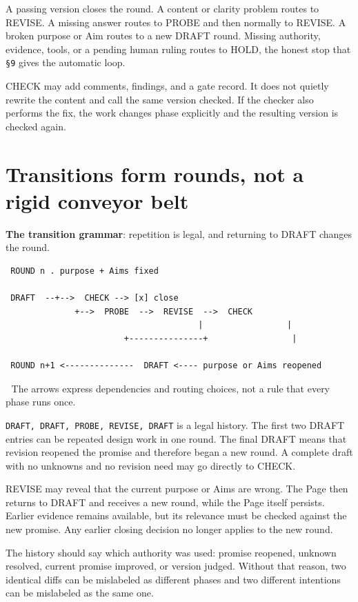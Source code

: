 A passing version closes the round. A content or clarity problem routes to REVISE. A missing answer routes to PROBE and then normally to REVISE. A broken purpose or Aim routes to a new DRAFT round. Missing authority, evidence, tools, or a pending human ruling routes to HOLD, the honest stop that \texttt{§9} gives the automatic loop.

CHECK may add comments, findings, and a gate record. It does not quietly rewrite the content and call the same version checked. If the checker also performs the fix, the work changes phase explicitly and the resulting version is checked again.


\section{Transitions form rounds, not a rigid conveyor belt}
\textbf{The transition grammar}: repetition is legal, and returning to DRAFT changes the round.

\begin{verbatim}
 ROUND n . purpose + Aims fixed

 DRAFT  --+-->  CHECK --> [x] close
              +-->  PROBE  -->  REVISE  -->  CHECK
                                       |                 |
                        +---------------+                 |

 ROUND n+1 <--------------  DRAFT <---- purpose or Aims reopened
\end{verbatim}
📌 The arrows express dependencies and routing choices, not a rule that every phase runs once.

\texttt{DRAFT, DRAFT, PROBE, REVISE, DRAFT} is a legal history. The first two DRAFT entries can be repeated design work in one round. The final DRAFT means that revision reopened the promise and therefore began a new round. A complete draft with no unknowns and no revision need may go directly to CHECK.

REVISE may reveal that the current purpose or Aims are wrong. The Page then returns to DRAFT and receives a new round, while the Page itself persists. Earlier evidence remains available, but its relevance must be checked against the new promise. Any earlier closing decision no longer applies to the new round.

The history should say which authority was used: promise reopened, unknown resolved, current promise improved, or version judged. Without that reason, two identical diffs can be mislabeled as different phases and two different intentions can be mislabeled as the same one.


